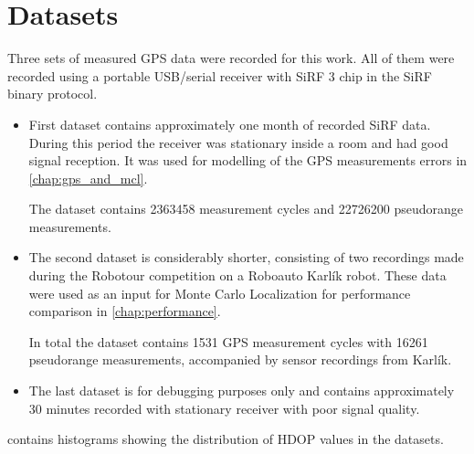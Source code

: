 \chapter{Datasets}
\label{chap:datasets}

Three sets of measured GPS data were recorded for this work.
All of them were recorded using a portable USB/serial receiver with SiRF 3 chip
in the SiRF binary protocol.

\begin{itemize}

\item
First dataset contains approximately one month of recorded SiRF data.
During this period the receiver was stationary inside a room and had good signal 
reception. 
It was used for modelling of the GPS measurements errors in \cref{chap:gps_and_mcl}.

The dataset contains \num{2363458} measurement cycles and
\num{22726200} pseudorange measurements.

\item
The second dataset is considerably shorter, consisting of two recordings made during
the Robotour competition \cite{robotour} on a Roboauto Karlík \cite{karlik} robot.
These data were used as an input for Monte Carlo Localization for performance comparison in \cref{chap:performance}.

In total the dataset contains \num{1531} GPS measurement cycles with
\num{16261} pseudorange measurements, accompanied by sensor recordings from Karlík.

\item
The last dataset is for debugging purposes only and contains approximately
30 minutes recorded with stationary receiver with poor signal quality.

\end{itemize}

 contains histograms showing the distribution of HDOP values in the datasets.

